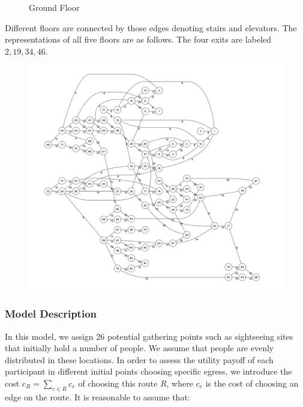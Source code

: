 \documentclass{mcmthesis}
\begin{document}
			\begin{figure} 
				\centering 
				\hspace{0.2in} 
				\caption{Ground Floor} 
				\label{fig:subfig_gd} %
			\end{figure}
			
			Different floors are connected by those edges denoting stairs and elevators. The representations of all five floors are as follows.  The four exits are labeled $2, 19, 34, 46$.
			\begin{figure}
				\centering
				\includegraphics[width=0.8\linewidth]{../../Figure/graph_whole}
				\caption{}
				\label{fig:graphwhole}
			\end{figure}
			
			\subsubsection{Model Description}
In this model, we assign 26 potential gathering points such as sightseeing sites that initially hold a  number of people. We assume that people  are evenly distributed in these locations. In order to assess the utility payoff of each participant in different initial points choosing specific egress, we introduce the cost $c_R = \sum\limits_{e \in R} c_e$ of choosing this route $R$, where $c_e$ is the cost of choosing an edge on the route. 
			It is reasonable to assume that:
			
\end{document}
